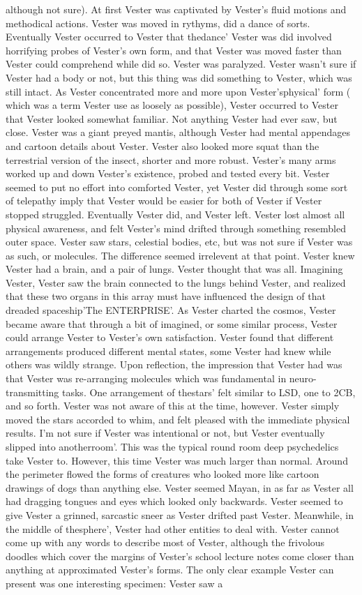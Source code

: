 \documentclass[12pt]{book}
\begin{document}
although not sure). At first Vester was captivated by Vester's fluid motions and methodical actions. Vester was moved in rythyms, did a dance of sorts. Eventually Vester occurred to Vester that thedance' Vester was did involved horrifying probes of Vester's own form, and that Vester was moved faster than Vester could comprehend while did so. Vester was paralyzed. Vester wasn't sure if Vester had a body or not, but this thing was did something to Vester, which was still intact. As Vester concentrated more and more upon Vester'sphysical' form ( which was a term Vester use as loosely as possible), Vester occurred to Vester that Vester looked somewhat familiar. Not anything Vester had ever saw, but close. Vester was a giant preyed mantis, although Vester had mental appendages and cartoon details about Vester. Vester also looked more squat than the terrestrial version of the insect, shorter and more robust. Vester's many arms worked up and down Vester's existence, probed and tested every bit. Vester seemed to put no effort into comforted Vester, yet Vester did through some sort of telepathy imply that Vester would be easier for both of Vester if Vester stopped struggled. Eventually Vester did, and Vester left. Vester lost almost all physical awareness, and felt Vester's mind drifted through something resembled outer space. Vester saw stars, celestial bodies, etc, but was not sure if Vester was as such, or molecules. The difference seemed irrelevent at that point. Vester knew Vester had a brain, and a pair of lungs. Vester thought that was all. Imagining Vester, Vester saw the brain connected to the lungs behind Vester, and realized that these two organs in this array must have influenced the design of that dreaded spaceship'The ENTERPRISE'. As Vester charted the cosmos, Vester became aware that through a bit of imagined, or some similar process, Vester could arrange Vester to Vester's own satisfaction. Vester found that different arrangements produced different mental states, some Vester had knew while others was wildly strange. Upon reflection, the impression that Vester had was that Vester was re-arranging molecules which was fundamental in neuro-transmitting tasks. One arrangement of thestars' felt similar to LSD, one to 2CB, and so forth. Vester was not aware of this at the time, however. Vester simply moved the stars accorded to whim, and felt pleased with the immediate physical results. I'm not sure if Vester was intentional or not, but Vester eventually slipped into anotherroom'. This was the typical round room deep psychedelics take Vester to. However, this time Vester was much larger than normal. Around the perimeter flowed the forms of creatures who looked more like cartoon drawings of dogs than anything else. Vester seemed Mayan, in as far as Vester all had dragging tongues and eyes which looked only backwards. Vester seemed to give Vester a grinned, sarcastic sneer as Vester drifted past Vester. Meanwhile, in the middle of thesphere', Vester had other entities to deal with. Vester cannot come up with any words to describe most of Vester, although the frivolous doodles which cover the margins of Vester's school lecture notes come closer than anything at approximated Vester's forms. The only clear example Vester can present was one interesting specimen: Vester saw a 
\end{document}
